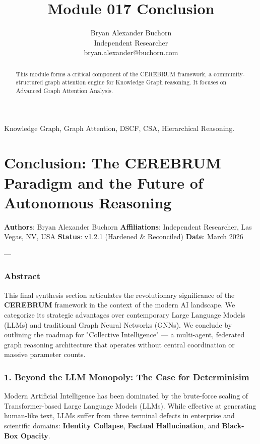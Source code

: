 \documentclass[10pt,journal,compsoc]{IEEEtran}
\begin{document}
\title{Module 017 Conclusion}
\author{Bryan Alexander Buchorn \\ Independent Researcher \\ bryan.alexander@buchorn.com}

\maketitle

\begin{abstract}
This module forms a critical component of the CEREBRUM framework, a community-structured graph attention engine for Knowledge Graph reasoning. It focuses on Advanced Graph Attention Analysis.
\end{abstract}

\begin{IEEEkeywords}
Knowledge Graph, Graph Attention, DSCF, CSA, Hierarchical Reasoning.
\end{IEEEkeywords}

\section{Conclusion: The CEREBRUM Paradigm and the Future of Autonomous Reasoning}

\textbf{Authors}: Bryan Alexander Buchorn  
\textbf{Affili\-ations}: Independent Researcher, Las Vegas, NV, USA  
\textbf{Status}: v1.2.1 (Hardened \& Reconciled)  
\textbf{Date}: March 2026

---

\subsubsection{Abstract}
This final synthesis section articulates the revol\-utionary signi\-ficance of the \textbf{CEREBRUM} framework in the context of the modern AI landscape. We categorize its strategic advantages over conte\-mporary Large Language Models (LLMs) and traditional Graph Neural Networks (GNNs). We conclude by outlining the roadmap for "Collective Intell\-igence" — a multi-agent, federated graph reasoning archi\-tecture that operates without central coord\-ination or massive parameter counts.

\subsubsection{1. Beyond the LLM Monopoly: The Case for Determ\-inisim}
Modern Artificial Intell\-igence has been dominated by the brute-force scaling of Transformer-based Large Language Models (LLMs). While effective at generating human-like text, LLMs suffer from three terminal defects in enterprise and scientific domains: \textbf{Identity Collapse}, \textbf{Factual Halluc\-ination}, and \textbf{Black-Box Opacity}. 
\end{document}
